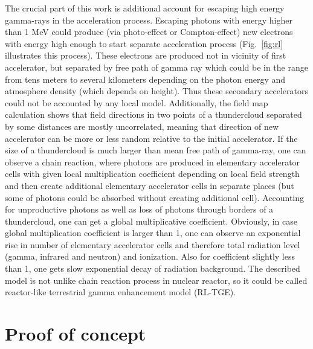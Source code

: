 \documentclass[%
 aip,
cp,  %
 amsmath,amssymb,%
 reprint,%
]{revtex4-2}
\begin{document}
The crucial part of this work is additional account for escaping high energy gamma-rays in the acceleration process. Escaping photons with energy higher than 1 MeV could produce (via photo-effect or Compton-effect) new electrons with energy high enough to start separate acceleration process (Fig.~\ref{fig:rl} illustrates this process). These electrons are produced not in vicinity of first accelerator, but separated by free path of gamma ray which could be in the range from tens meters to several kilometers depending on the photon energy and atmosphere density (which depends on height). Thus these secondary accelerators could not be accounted by any local model. Additionally, the field map calculation shows that field directions in two points of a thundercloud separated by some distances are mostly uncorrelated, meaning that direction of new accelerator can be more or less random relative to the initial accelerator. If the size of a thundercloud is much larger than mean free path of gamma-ray, one can observe a chain reaction, where photons are produced in elementary accelerator cells with given local multiplication coefficient depending on local field strength and then create additional elementary accelerator cells in separate places (but some of photons could be absorbed without creating additional cell). Accounting for unproductive photons as well as loss of photons through borders of a thundercloud, one can get a global multiplicative coefficient. Obviously, in case global multiplication coefficient is larger than 1, one can observe an exponential rise in number of elementary accelerator cells and therefore total radiation level (gamma, infrared and neutron) and ionization. Also for coefficient slightly less than 1, one gets slow exponential decay of radiation background. The described model is not unlike chain reaction process in nuclear reactor, so it could be called reactor-like terrestrial gamma enhancement model (RL-TGE).

\section{Proof of concept}
\end{document}

